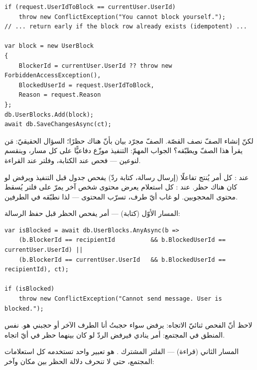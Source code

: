 \begin{english}
\begin{lstlisting}[language={[Sharp]C}]
if (request.UserIdToBlock == currentUser.UserId)
    throw new ConflictException("You cannot block yourself.");
// ... return early if the block row already exists (idempotent) ...

var block = new UserBlock
{
    BlockerId = currentUser.UserId ?? throw new ForbiddenAccessException(),
    BlockedUserId = request.UserIdToBlock,
    Reason = request.Reason
};
db.UserBlocks.Add(block);
await db.SaveChangesAsync(ct);
\end{lstlisting}
\end{english}

لكنّ إنشاء الصفّ نصف القصّة. الصفّ مجرّد بيان بأنّ هناك حظرًا؛ السؤال الحقيقيّ:
مَن يقرأ هذا الصفّ ويطبّقه؟ الجواب المهمّ: التنفيذ موزّع دفاعيًّا على كل مسار، وينقسم
لنوعين — فحص عند الكتابة، وفلتر عند القراءة.

\begin{idea}[الفكرة: تنفيذ الحظر = كتابة + قراءة]
عند : كل أمر يُنتج تفاعلًا (إرسال رسالة، كتابة ردّ) يفحص جدول 
قبل التنفيذ ويرفض لو كان هناك حظر. عند : كل استعلام يعرض محتوى شخص آخر
يمرّ على فلتر يُسقط محتوى المحجوبين. لو غاب أيّ طرف، تسرّب المحتوى — لذا نطبّقه في الطرفين.
\end{idea}

المسار الأوّل (كتابة) — أمر  يفحص الحظر قبل حفظ الرسالة:

\begin{english}
\begin{lstlisting}[language={[Sharp]C}]
var isBlocked = await db.UserBlocks.AnyAsync(b =>
    (b.BlockerId == recipientId          && b.BlockedUserId == currentUser.UserId) ||
    (b.BlockerId == currentUser.UserId   && b.BlockedUserId == recipientId), ct);

if (isBlocked)
    throw new ConflictException("Cannot send message. User is blocked.");
\end{lstlisting}
\end{english}

لاحظ أنّ الفحص ثنائيّ الاتجاه: يرفض سواء حجبتُ أنا الطرف الآخر أو حجبني هو. نفس
المنطق في المجتمع: أمر  ينادي  فيرفض الردّ
لو كان بينهما حظر في أيّ اتجاه.

المسار الثاني (قراءة) — الفلتر المشترك . هو تعبير
 واحد تستخدمه كل استعلامات المجتمع، حتى لا تنحرف دلالة الحظر بين مكان
وآخر:

